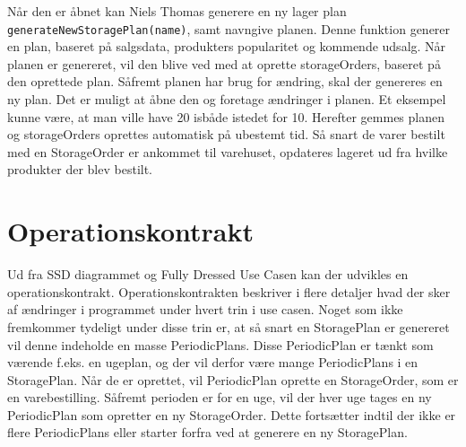 Når den er åbnet kan Niels Thomas generere en ny lager plan \verb|generateNewStoragePlan(name)|, samt navngive planen. Denne funktion generer en plan, baseret på salgsdata, produkters popularitet og kommende udsalg. Når planen er genereret, vil den blive ved med at oprette storageOrders, baseret på den oprettede plan. 
Såfremt planen har brug for ændring, skal der genereres en ny plan. Det er muligt at åbne den og foretage ændringer i planen. Et eksempel kunne være, at man ville have 20 isbåde istedet for 10. Herefter gemmes planen og storageOrders oprettes automatisk på ubestemt tid. 
Så snart de varer bestilt med en StorageOrder er ankommet til varehuset, opdateres lageret ud fra hvilke produkter der blev bestilt.

\section{Operationskontrakt}
Ud fra SSD diagrammet og Fully Dressed Use Casen kan der udvikles en operationskontrakt. Operationskontrakten beskriver i flere detaljer hvad der sker af ændringer i programmet under hvert trin i use casen. Noget som ikke fremkommer tydeligt under disse trin er, at så snart en StoragePlan er genereret vil denne indeholde en masse PeriodicPlans. Disse PeriodicPlan er tænkt som værende f.eks. en ugeplan, og der vil derfor være mange PeriodicPlans i en StoragePlan. Når de er oprettet, vil PeriodicPlan oprette en StorageOrder, som er en varebestilling. Såfremt perioden er for en uge, vil der hver uge tages en ny PeriodicPlan som opretter en ny StorageOrder. Dette fortsætter indtil der ikke er flere PeriodicPlans eller starter forfra ved at generere en ny StoragePlan.

